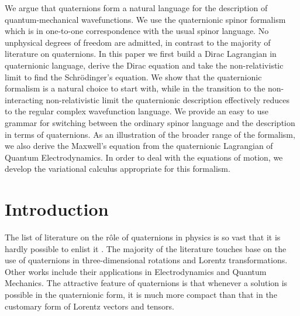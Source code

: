 \documentclass[epsfig,12pt]{article}
\begin{document}
\begin{titlepage}
\hspace{0.3cm}
	We argue that quaternions form a natural language for the description of quantum-mechanical wavefunctions.
	We use the quaternionic spinor formalism which is in one-to-one correspondence with the usual
	spinor language.
	No unphysical degrees of freedom are admitted, in contrast to the majority of literature on quaternions.
	In this paper we first build a Dirac Lagrangian in quaternionic language,
	derive the Dirac equation and take the non-relativistic limit to find the Schr\"odinger's equation.
	We show that the quaternionic formalism is a natural choice to start with,
	while in the transition to the non-interacting non-relativistic limit the quaternionic description 
	effectively reduces to the regular complex wavefunction language.
	We provide an easy to use grammar for switching between the ordinary spinor language
	and the description in terms of quaternions.
	As an illustration of the broader range of the formalism,
	we also derive the Maxwell's equation from the quaternionic Lagrangian of Quantum Electrodynamics.
	In order to deal with the equations of motion, we develop the variational calculus
	appropriate for this formalism.
\vspace{2cm}


\end{titlepage}




\section{Introduction}
\setcounter{equation}{0}

	The list of literature on the r\^ole of quaternions in physics is so vast that it is hardly
	possible to enlist it \cite{}.
	The majority of the literature touches base on the use of quaternions in three-dimensional
	rotations and Lorentz transformations.
	Other works include their applications in Electrodynamics and Quantum Mechanics.
	The attractive feature of quaternions is that whenever a solution is possible in the quaternionic form,
	it is much more compact than that in the customary form of Lorentz vectors and tensors. 
\end{document}
